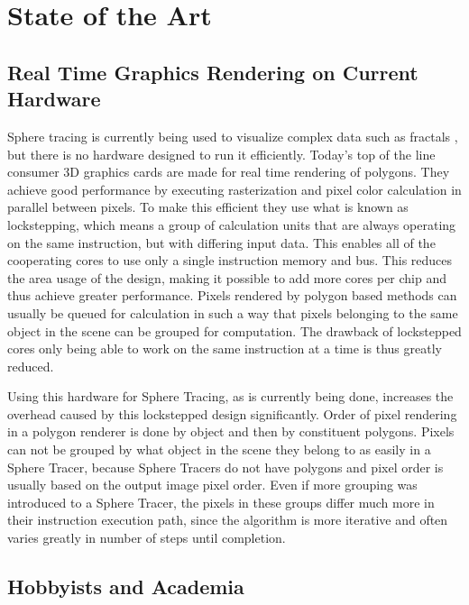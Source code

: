\chapter{State of the Art}

	\section{ Real Time Graphics Rendering on Current Hardware } 

		Sphere tracing is currently being used to visualize complex data such
		as fractals \cite{granskog2017}, but there is no hardware designed to
		run it efficiently.  Today's top of the line consumer 3D graphics cards
		are made for real time rendering of polygons\cite{Houston2010}. They achieve good
		performance by executing rasterization and pixel color calculation in
		parallel between pixels. To make this efficient they use what is known
		as lockstepping, which means a group of calculation units that are
		always operating on the same instruction, but with differing input
		data. This enables all of the cooperating cores to use only a single
		instruction memory and bus. This reduces the area usage of the design,
		making it possible to add more cores per chip and thus achieve greater
		performance. Pixels rendered by polygon based methods can usually be
		queued for calculation in such a way that pixels belonging to the same
		object in the scene can be grouped for computation. The drawback of
		lockstepped cores only being able to work on the same instruction at a
		time is thus greatly reduced.
		
		Using this hardware for Sphere Tracing, as is currently being done,
		increases the overhead caused by this lockstepped design significantly.
		Order of pixel rendering in a polygon renderer is done by object and
		then by constituent polygons. Pixels can not be grouped by what object
		in the scene they belong to as easily in a Sphere Tracer, because Sphere
		Tracers do not have polygons and pixel order is usually based on the
		output image pixel order. Even if more grouping was introduced to a
		Sphere Tracer, the pixels in these groups differ much more in their
		instruction execution path, since the algorithm is more iterative and
		often varies greatly in number of steps until completion.
		
	\section{ Hobbyists and Academia }

